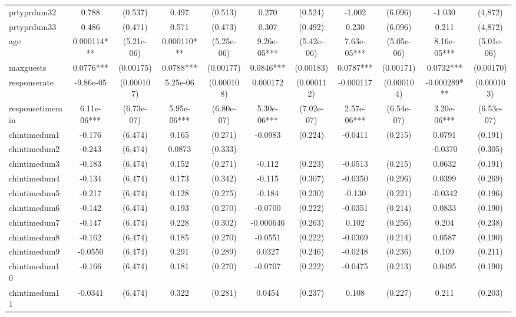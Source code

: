 \documentclass[]{article}
\begin{document}
\begin{tabular}{lcccccccccc}
prtyprdum32 & 0.788 & (0.537) & 0.497 & (0.513) & 0.270 & (0.524) & -1.002 & (6,096) & -1.030 & (4,872) \\
prtyprdum33 & 0.486 & (0.471) & 0.571 & (0.473) & 0.307 & (0.492) & 0.230 & (6,096) & 0.211 & (4,872) \\
age & 0.000114*** & (5.21e-06) & 0.000110*** & (5.25e-06) & 9.26e-05*** & (5.42e-06) & 7.63e-05*** & (5.05e-06) & 8.16e-05*** & (5.01e-06) \\
maxguests & 0.0776*** & (0.00175) & 0.0788*** & (0.00177) & 0.0846*** & (0.00183) & 0.0787*** & (0.00171) & 0.0732*** & (0.00170) \\
responserate & -9.86e-05 & (0.000107) & 5.25e-06 & (0.000108) & 0.000172 & (0.000112) & -0.000117 & (0.000104) & -0.000289*** & (0.000103) \\
responsetimemin & 6.11e-06*** & (6.73e-07) & 5.95e-06*** & (6.80e-07) & 5.30e-06*** & (7.02e-07) & 2.57e-06*** & (6.54e-07) & 3.20e-06*** & (6.53e-07) \\
chintimedum1 & -0.176 & (6,474) & 0.165 & (0.271) & -0.0983 & (0.224) & -0.0411 & (0.215) & 0.0791 & (0.191) \\
chintimedum2 & -0.243 & (6,474) & 0.0873 & (0.333) &  &  &  &  & -0.0370 & (0.305) \\
chintimedum3 & -0.183 & (6,474) & 0.152 & (0.271) & -0.112 & (0.223) & -0.0513 & (0.215) & 0.0632 & (0.191) \\
chintimedum4 & -0.134 & (6,474) & 0.173 & (0.342) & -0.115 & (0.307) & -0.0350 & (0.296) & 0.0399 & (0.269) \\
chintimedum5 & -0.217 & (6,474) & 0.128 & (0.275) & -0.184 & (0.230) & -0.130 & (0.221) & -0.0342 & (0.196) \\
chintimedum6 & -0.142 & (6,474) & 0.193 & (0.270) & -0.0700 & (0.222) & -0.0351 & (0.214) & 0.0833 & (0.190) \\
chintimedum7 & -0.147 & (6,474) & 0.228 & (0.302) & -0.000646 & (0.263) & 0.102 & (0.256) & 0.204 & (0.238) \\
chintimedum8 & -0.162 & (6,474) & 0.185 & (0.270) & -0.0551 & (0.222) & -0.0369 & (0.214) & 0.0587 & (0.190) \\
chintimedum9 & -0.0550 & (6,474) & 0.291 & (0.289) & 0.0327 & (0.246) & -0.0248 & (0.236) & 0.109 & (0.211) \\
chintimedum10 & -0.166 & (6,474) & 0.181 & (0.270) & -0.0707 & (0.222) & -0.0475 & (0.213) & 0.0495 & (0.190) \\
chintimedum11 & -0.0341 & (6,474) & 0.322 & (0.281) & 0.0454 & (0.237) & 0.108 & (0.227) & 0.211 & (0.203) \\

\end{tabular}
\end{document}
